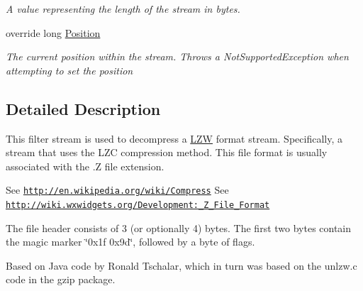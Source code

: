 \begin{DoxyCompactItemize}
\begin{DoxyCompactList}\small\item\em A value representing the length of the stream in bytes. \end{DoxyCompactList}\item 
override long \hyperlink{class_i_c_sharp_code_1_1_sharp_zip_lib_1_1_l_z_w_1_1_lzw_input_stream_a183217e4bc94ad385f11536c06c851bf}{Position}
\begin{DoxyCompactList}\small\item\em The current position within the stream. Throws a Not\+Supported\+Exception when attempting to set the position \end{DoxyCompactList}\end{DoxyCompactItemize}


\subsection{Detailed Description}
This filter stream is used to decompress a \hyperlink{namespace_i_c_sharp_code_1_1_sharp_zip_lib_1_1_l_z_w}{L\+ZW} format stream. Specifically, a stream that uses the L\+ZC compression method. This file format is usually associated with the .Z file extension. 

See \href{http://en.wikipedia.org/wiki/Compress}{\tt http\+://en.\+wikipedia.\+org/wiki/\+Compress} See \href{http://wiki.wxwidgets.org/Development:_Z_File_Format}{\tt http\+://wiki.\+wxwidgets.\+org/\+Development\+:\+\_\+\+Z\+\_\+\+File\+\_\+\+Format}

The file header consists of 3 (or optionally 4) bytes. The first two bytes contain the magic marker \char`\"{}0x1f 0x9d\char`\"{}, followed by a byte of flags.

Based on Java code by Ronald Tschalar, which in turn was based on the unlzw.\+c code in the gzip package. 

